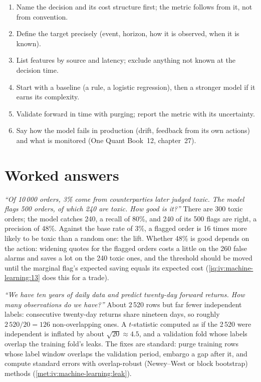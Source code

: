 \begin{method}\label{met:iv:machine-learning:design}
\begin{enumerate}
\item Name the decision and its cost structure first; the metric follows from it, not from convention.
\item Define the target precisely (event, horizon, how it is observed, when it is known).
\item List features by source and latency; exclude anything not known at the decision time.
\item Start with a baseline (a rule, a logistic regression), then a stronger model if it earns its complexity.
\item Validate forward in time with purging; report the metric with its uncertainty.
\item Say how the model fails in production (drift, feedback from its own actions) and what is monitored
(One Quant Book~12, chapter~27).
\end{enumerate}
\end{method}

\section{Worked answers}

\begin{example}\label{ex:iv:machine-learning:confusion}
\emph{``Of 10\,000 orders, 3\% come from counterparties later judged toxic. The model flags 500 orders, of which 240 are
toxic. How good is it?''} There are 300 toxic orders; the model catches 240, a recall of 80\%, and 240 of its 500 flags are
right, a precision of 48\%. Against the base rate of 3\%, a flagged order is 16 times more likely to be toxic than a random
one: the lift. Whether 48\% is good depends on the action: widening quotes for the flagged orders costs a little on the 260
false alarms and saves a lot on the 240 toxic ones, and the threshold should be moved until the marginal flag's expected
saving equals its expected cost (\cref{iq:iv:machine-learning:13} does this for a trade).
\end{example}

\begin{example}\label{ex:iv:machine-learning:overlap}
\emph{``We have ten years of daily data and predict twenty-day forward returns. How many observations do we have?''}
About 2\,520 rows but far fewer independent labels: consecutive twenty-day returns share nineteen days, so roughly
$2\,520/20 = 126$ non-overlapping ones. A $t$-statistic computed as if the 2\,520 were independent is inflated by about
$\sqrt{20} \approx 4.5$, and a validation fold whose labels overlap the training fold's leaks. The fixes are standard:
purge training rows whose label window overlaps the validation period, embargo a gap after it, and compute standard errors
with overlap-robust (Newey--West or block bootstrap) methods (\cref{met:iv:machine-learning:leak}).
\end{example}

